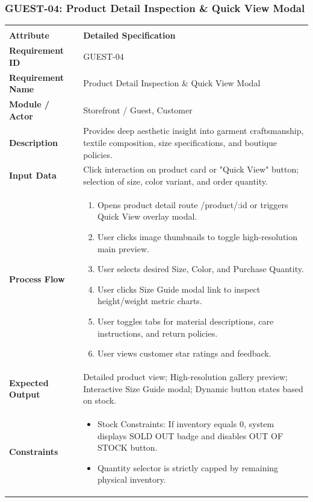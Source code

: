 \documentclass[12pt,a4paper,oneside]{report}
\begin{document}
\subsubsection{GUEST-04: Product Detail Inspection \& Quick View Modal}
\begin{longtable}{|p{3.6cm}|p{11.9cm}|}
\hline
\rowcolor{PrimaryBrown}
\multicolumn{2}{|p{15.5cm}|}{\textbf{\textcolor{white}{Functional Specification: GUEST-04 -- Product Detail Inspection \& Quick View Modal}}} \\
\hline
\endfirsthead
\hline
\rowcolor{PrimaryBrown}
\multicolumn{2}{|p{15.5cm}|}{\textbf{\textcolor{white}{Functional Specification: GUEST-04 (Continued)}}} \\
\hline
\textbf{Attribute} & \textbf{Detailed Specification} \\
\hline
\endhead
\hline
\endfoot
\textbf{Requirement ID} & GUEST-04 \\
\hline
\textbf{Requirement Name} & Product Detail Inspection \& Quick View Modal \\
\hline
\textbf{Module / Actor} & Storefront / Guest, Customer \\
\hline
\textbf{Description} & Provides deep aesthetic insight into garment craftsmanship, textile composition, size specifications, and boutique policies. \\
\hline
\textbf{Input Data} & Click interaction on product card or "Quick View" button; selection of size, color variant, and order quantity. \\
\hline
\textbf{Process Flow} & \begin{enumerate}[leftmargin=*,nosep,topsep=2pt]
  \item Opens product detail route /product/:id or triggers Quick View overlay modal.
  \item User clicks image thumbnails to toggle high-resolution main preview.
  \item User selects desired Size, Color, and Purchase Quantity.
  \item User clicks Size Guide modal link to inspect height/weight metric charts.
  \item User toggles tabs for material descriptions, care instructions, and return policies.
  \item User views customer star ratings and feedback.
\end{enumerate} \\
\hline
\textbf{Expected Output} & Detailed product view; High-resolution gallery preview; Interactive Size Guide modal; Dynamic button states based on stock. \\
\hline
\textbf{Constraints} & \begin{itemize}[leftmargin=*,nosep,topsep=2pt]
  \item Stock Constraints: If inventory equals 0, system displays SOLD OUT badge and disables OUT OF STOCK button.
  \item Quantity selector is strictly capped by remaining physical inventory.
\end{itemize} \\
\hline
\end{longtable}
\end{document}
